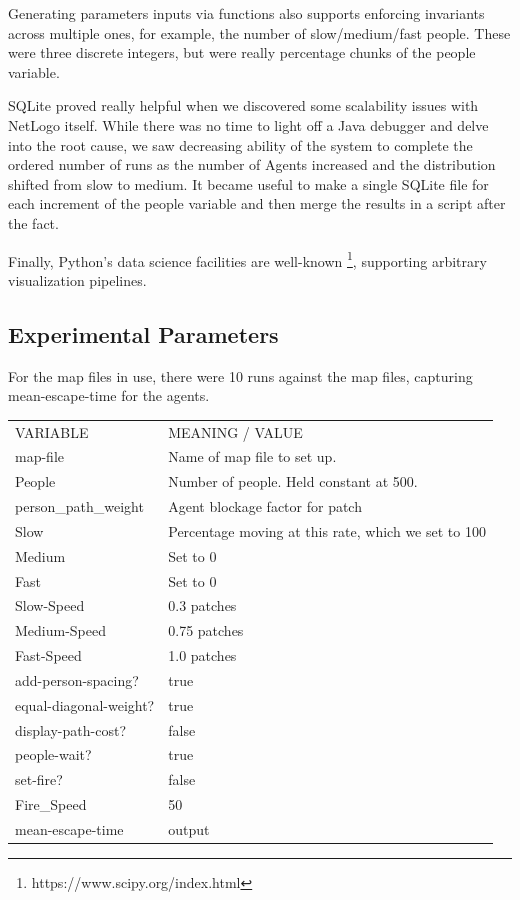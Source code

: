 \documentclass[12pt,letterpaper]{article}
\begin{document}
Generating parameters inputs via functions also supports enforcing invariants
across multiple ones, for example, the number of slow/medium/fast people. These
were three discrete integers, but were really percentage chunks of the people
variable.

SQLite proved really helpful when we discovered some scalability issues with
NetLogo itself. While there was no time to light off a Java debugger and delve
into the root cause, we saw decreasing ability of the system to complete the
ordered number of runs as the number of Agents increased and the distribution
shifted from slow to medium. It became useful to make a single SQLite file for
each increment of the people variable and then merge the results in a script
after the fact.

Finally, Python's data science facilities are well-known \footnote{https://www.scipy.org/index.html}, supporting arbitrary
visualization pipelines.

\subsection{Experimental Parameters}
For the map files in use, there were 10 runs against the map files, capturing
mean-escape-time for the agents.

\begin{tabular}{ l | l }
VARIABLE & MEANING / VALUE \\
map-file & Name of map file to set up. \\
People & Number  of people. Held constant at 500. \\
person\_path\_weight & Agent blockage factor for patch \\
Slow & Percentage moving at this rate, which we set to 100 \\
Medium & Set to 0 \\
Fast & Set to 0 \\
Slow-Speed & 0.3 patches \\
Medium-Speed & 0.75 patches \\
Fast-Speed & 1.0 patches \\
add-person-spacing? & true \\
equal-diagonal-weight? & true \\
display-path-cost? & false \\
people-wait? & true \\
set-fire? & false \\
Fire\_Speed & 50 \\
mean-escape-time & output \\
\end{tabular}
\end{document}
